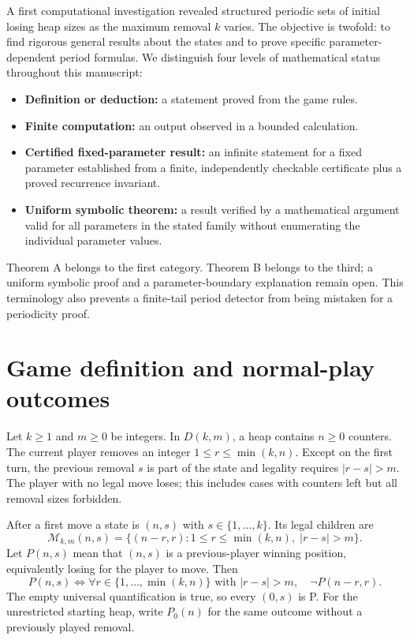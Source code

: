 \documentclass[11pt]{article}
\newcommand{\K}{\{1,\ldots,k\}}
\begin{document}
A first computational investigation revealed structured periodic sets of
initial losing heap sizes as the maximum removal $k$ varies.  The objective
is twofold: to find rigorous general results about the states and to prove
specific parameter-dependent period formulas.  We distinguish four levels
of mathematical status throughout this manuscript:
\begin{itemize}
\item \textbf{Definition or deduction:} a statement proved from the game rules.
\item \textbf{Finite computation:} an output observed in a bounded calculation.
\item \textbf{Certified fixed-parameter result:} an infinite statement for a
fixed parameter established from a finite, independently checkable certificate
plus a proved recurrence invariant.
\item \textbf{Uniform symbolic theorem:} a result verified by a mathematical
argument valid for all parameters in the stated family without enumerating
the individual parameter values.
\end{itemize}

Theorem A belongs to the first category. Theorem B belongs to the third;
a uniform symbolic proof and a parameter-boundary explanation remain open.
This terminology also prevents a finite-tail period detector from being
mistaken for a periodicity proof.

\section{Game definition and normal-play outcomes}
Let $k\ge1$ and $m\ge0$ be integers.  In $D(k,m)$, a heap contains $n\ge0$
counters.  The current player removes an integer
$1\le r\le\min(k,n)$.  Except on the first turn, the previous removal $s$
is part of the state and legality requires $|r-s|>m$.
The player with no legal move loses; this includes cases with counters left
but all removal sizes forbidden.

After a first move a state is $(n,s)$ with $s\in\K$.  Its legal children are
\[
\mathcal{M}_{k,m}(n,s)
=\{(n-r,r): 1\le r\le\min(k,n),\;|r-s|>m\}.
\]
Let $P(n,s)$ mean that $(n,s)$ is a previous-player winning position,
equivalently losing for the player to move.  Then
\begin{equation}\label{eq:pn}
P(n,s)\iff\forall r\in\{1,\ldots,\min(k,n)\}
\text{ with }|r-s|>m,\quad \neg P(n-r,r).
\end{equation}
The empty universal quantification is true, so every $(0,s)$ is P.
For the unrestricted starting heap, write $P_0(n)$ for the same outcome
without a previously played removal.
\end{document}
